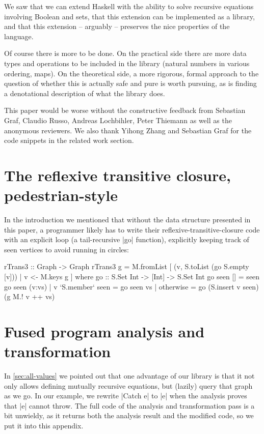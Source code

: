 \documentclass[manuscript,screen,acmsmall,nonacm]{acmart}
\begin{document}
We saw that we can extend Haskell with the ability to solve recursive equations involving Boolean and sets, that this extension can be implemented as a library, and that this extension -- arguably -- preserves the nice properties of the language.

Of course there is more to be done. On the practical side there are more data types and operations to be included in the library (natural numbers in various ordering, maps). On the theoretical side, a more rigorous, formal approach to the question of whether this is actually safe and pure is worth pursuing, as is finding a denotational description of what the library does.

\begin{acks}
This paper would be worse without the constructive feedback from Sebastian Graf, Claudio Russo, Andreas Lochbihler, Peter Thiemann as well as the anonymous reviewers. We also thank Yihong Zhang and Sebastian Graf for the code snippets in the related work section.
\end{acks}

\clearpage

\appendix
\section{The reflexive transitive closure, pedestrian-style}\label{sec:imp}

In the introduction we mentioned that without the data structure presented in this paper, a programmer likely has to write their reflexive-transitive-closure code with an explicit loop (a tail-recursive |go| function), explicitly keeping track of seen vertices to avoid running in circles:
\begin{code}
rTrans3 :: Graph -> Graph
rTrans3 g = M.fromList [ (v, S.toList (go S.empty [v])) | v <- M.keys g ]
  where
    go :: S.Set Int -> [Int] -> S.Set Int
    go seen [] = seen
    go seen (v:vs)  |  v `S.member` seen  =  go seen vs
                    |  otherwise          =  go (S.insert v seen) (g M.! v ++ vs)
\end{code}

\section{Fused program analysis and transformation}\label{sec:proganalexp}

In \cref{sec:all-values} we pointed out that one advantage of our library is that it not only allows defining mutually recursive equations, but (lazily) query that graph as we go. In our example, we rewrite |Catch e| to |e| when the analysis proves that |e| cannot throw. The full code of the analysis and transformation pass is a bit unwieldy, as it returns both the analysis result and the modified code, so we put it into this appendix.
\end{document}
